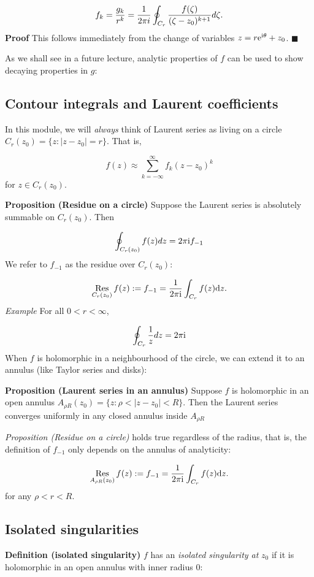 \documentclass[12pt,a4paper]{article}
\def\D{ {\rm d} }
\def\I{ {\rm i} }
\def\E{ {\rm e} }
\def\Res_#1{\underset{#1}{\rm Res}\,}
\begin{document}
\[
f_k = {g_k \over r^k} = {1 \over 2 \pi i} \oint_{C_r} {f(\zeta) \over (\zeta - z_0)^{k+1}} d \zeta.
\]
\textbf{Proof}  This follows immediately from the change of variables $z = r \E^{\I \theta} + z_0$. \ensuremath{\blacksquare}

As we shall see in a future lecture, analytic properties of $f$ can be used to show decaying properties in $g$:

\subsection{Contour integrals and Laurent coefficients}
In this module, we will \emph{always} think of Laurent series as living on a circle $C_r(z_0) = \{z : |z-z_0| = r \}$. That is,

\[
    f(z) \approx \sum_{k=-\infty}^\infty f_k (z-z_0)^k
\]
for $z \in C_r(z_0)$.

\textbf{Proposition (Residue on a circle)} Suppose the Laurent series is absolutely summable on $C_r(z_0)$. Then

\[
\oint_{C_r(z_0)} f(z) dz = 2 \pi \I f_{-1}
\]
We refer to $f_{-1}$ as the residue over $C_r(z_0)$:

\[
\Res_{C_r(z_0)} f(z) := f_{-1} = {1 \over 2 \pi \I} \int_{C_r} f(z) \D z.
\]
\emph{Example} For all $0 < r < \infty$,

\[
\oint_{C_r} {1 \over z} dz = 2 \pi \I
\]
When $f$ is holomorphic in a neighbourhood of the circle, we can extend it to an annulus (like Taylor series and disks):

\textbf{Proposition (Laurent series in an annulus)} Suppose $f$ is holomorphic in an open annulus $A_{\rho R}(z_0) = \{z : \rho  < | z - z_0| < R\}$. Then the Laurent series converges uniformly in  any closed annulus inside $A_{\rho R}$

\emph{Proposition (Residue on a circle)} holds true regardless of the radius, that is, the definition of $f_{-1}$ only depends on the annulus of analyticity:

\[
\Res_{A_{\rho R}(z_0)} f(z) := f_{-1} = {1 \over 2 \pi \I} \int_{C_r} f(z) \D z.
\]
for any $\rho < r < R$.

\subsection{Isolated singularities}
\textbf{Definition (isolated singularity)} $f$ has an  \emph{isolated singularity at} $z_0$ if it is holomorphic in an open annulus with inner radius 0:
\end{document}
